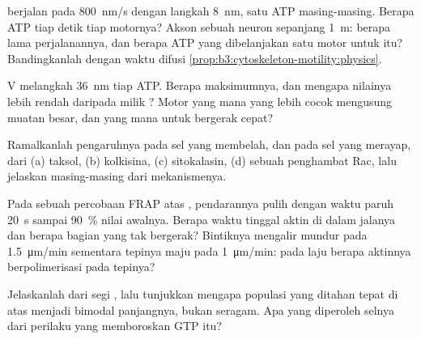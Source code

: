 \begin{exercise}[$\star\star$]\label{exo:b3:cytoskeleton-motility:6}
 berjalan pada \qty{800}{nm/s} dengan langkah \qty{8}{nm}, satu ATP
masing-masing. Berapa ATP tiap detik tiap motornya? Akson sebuah neuron
sepanjang \qty{1}{m}: berapa lama perjalanannya, dan berapa ATP yang
dibelanjakan satu motor untuk itu? Bandingkanlah
dengan waktu difusi \cref{prop:b3:cytoskeleton-motility:physics}.
\end{exercise}

\begin{exercise}[$\star\star$]\label{exo:b3:cytoskeleton-motility:7}
 V melangkah \qty{36}{nm} tiap ATP. Berapa  maksimumnya,
dan mengapa nilainya lebih rendah daripada milik ? Motor yang mana yang
lebih cocok mengusung muatan besar, dan yang mana untuk bergerak cepat?
\end{exercise}

\begin{exercise}[$\star\star$]\label{exo:b3:cytoskeleton-motility:8}
Ramalkanlah pengaruhnya pada sel yang membelah, dan pada sel yang merayap, dari
(a) taksol, (b) kolkisina, (c) sitokalasin, (d) sebuah penghambat Rac, lalu
jelaskan masing-masing dari mekanismenya.
\end{exercise}

\begin{exercise}[$\star\star$]\label{exo:b3:cytoskeleton-motility:9}
Pada sebuah percobaan FRAP atas , pendarannya pulih dengan
waktu paruh \qty{20}{s} sampai \qty{90}{\%} nilai awalnya. Berapa
waktu tinggal aktin di dalam jalanya dan berapa bagian yang tak bergerak?
Bintiknya mengalir mundur pada \qty{1.5}{\micro m/min} sementara tepinya
maju pada \qty{1}{\micro m/min}: pada laju berapa aktinnya berpolimerisasi
pada tepinya?
\end{exercise}

\begin{exercise}[$\star\star\star$]\label{exo:b3:cytoskeleton-motility:10}
Jelaskanlah  dari segi , lalu tunjukkan mengapa
populasi  yang ditahan tepat di atas 
menjadi bimodal panjangnya, bukan seragam. Apa yang diperoleh selnya
dari perilaku yang memboroskan GTP itu?
\end{exercise}

